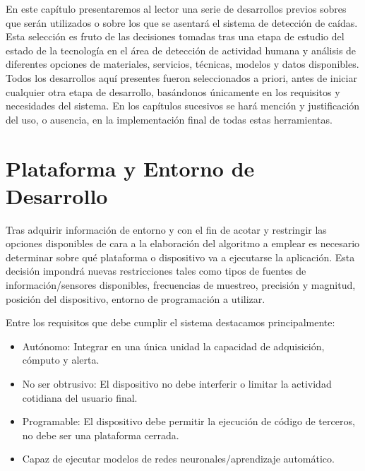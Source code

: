 % 


En este capítulo presentaremos al lector una serie de desarrollos previos sobres que serán utilizados o sobre los que se asentará el sistema de detección de caídas. Esta selección es fruto de las decisiones tomadas tras una etapa de estudio del estado de la tecnología en el área de detección de actividad humana y análisis de diferentes opciones de materiales, servicios, técnicas, modelos y datos disponibles. Todos los desarrollos aquí presentes fueron seleccionados a priori, antes de iniciar cualquier otra etapa de desarrollo, basándonos únicamente en los requisitos y necesidades del sistema. En los capítulos sucesivos se hará mención y justificación del uso, o ausencia, en la implementación final de todas estas herramientas.

\section{Plataforma y Entorno de Desarrollo}\label{sec:req:plataforma}

Tras adquirir información de entorno y con el fin de acotar y restringir las opciones disponibles de cara a la elaboración del algoritmo a emplear es necesario determinar sobre qué plataforma o dispositivo va a ejecutarse la aplicación. Esta decisión impondrá nuevas restricciones tales como tipos de fuentes de información/sensores disponibles, frecuencias de muestreo, precisión y magnitud, posición del dispositivo, entorno de programación a utilizar. 

Entre los requisitos que debe cumplir el sistema destacamos principalmente:

\begin{itemize}
  \item Autónomo: Integrar en una única unidad la capacidad de adquisición, cómputo y alerta.
  \item No ser obtrusivo: El dispositivo no debe interferir o limitar la actividad cotidiana del usuario final.
  \item Programable: El dispositivo debe permitir la ejecución de código de terceros, no debe ser una plataforma cerrada.
  \item Capaz de ejecutar modelos de redes neuronales/aprendizaje automático.
\end{itemize}

